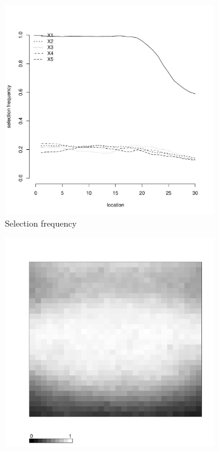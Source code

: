 \documentclass[authoryear, review, 11pt]{elsarticle}
\begin{document}
\begin{figure}
\begin{subfigure}[b]{0.45\textwidth}
		\includegraphics[width=\textwidth]{../../figures/simulation/15.8.profile_selection.pdf}
		\caption{Selection frequency}
	\end{subfigure}
	\begin{subfigure}[b]{0.45\textwidth}
	\centering
		\includegraphics[width=\textwidth]{../../figures/simulation/X1.15.8.unshrunk_bootstrap_coverage.pdf}

\end{subfigure}
\end{figure}
\end{document}
